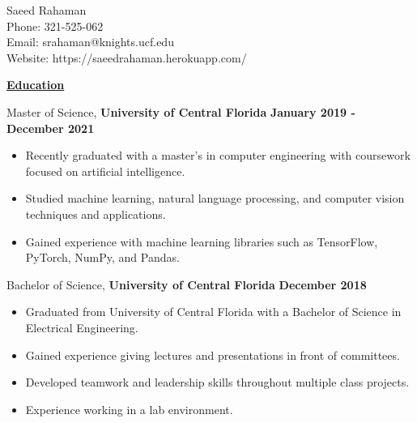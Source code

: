 \documentclass[11pt]{article}
\begin{document}

   \begin{center}
      Saeed Rahaman\\
      Phone: 321-525-062\\
      Email: srahaman@knights.ucf.edu\\
      Website: https://saeedrahaman.herokuapp.com/ \\
   \end{center}


   \noindent\underline{\textbf{Education}}
   \vspace{0.25cm}

   \begin{minipage}{0.95\textwidth}
      Master of Science, \textbf{University of Central Florida} \hfill \textbf{January 2019 - December 2021}

      \vspace{-0.25cm}
      
      \begin{itemize}\setlength\itemsep{-0.2cm}
         \item Recently graduated with a master’s in computer engineering with coursework focused on artificial intelligence.
         \item Studied machine learning, natural language processing, and computer vision techniques and applications.
         \item Gained experience with machine learning libraries such as TensorFlow, PyTorch, NumPy, and Pandas.
      \end{itemize}

      Bachelor of Science, \textbf{University of Central Florida} \hfill \textbf{December 2018}

      \vspace{-0.25cm}

      \begin{itemize}\setlength\itemsep{-0.2cm}
         \item Graduated from University of Central Florida with a Bachelor of Science in Electrical Engineering.
         \item Gained experience giving lectures and presentations in front of committees.
         \item Developed teamwork and leadership skills throughout multiple class projects.
         \item Experience working in a lab environment.
      \end{itemize}
   \end{minipage}
\end{document}
